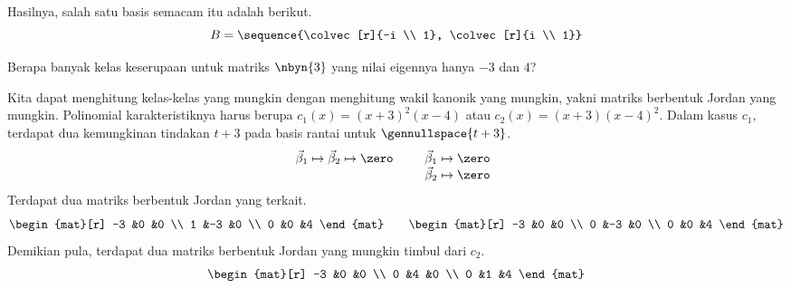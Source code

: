 \begin{exercises}
\begin{answer}
       Hasilnya, salah satu basis semacam itu adalah berikut.
       \begin{equation*}
         B=\sequence{\colvec[r]{-i \\ 1},
                     \colvec[r]{i \\ 1}}
       \end{equation*}  
     \end{answer}
  \item 
    Berapa banyak kelas keserupaan untuk matriks \( \nbyn{3} \)
    yang nilai eigennya hanya \( -3 \) dan \( 4 \)?
    \begin{answer}
     Kita dapat menghitung kelas-kelas yang mungkin dengan menghitung
     wakil kanonik yang mungkin, yakni matriks berbentuk Jordan yang mungkin.
     Polinomial karakteristiknya harus berupa $c_1(x)=(x+3)^2(x-4)$
     atau $c_2(x)=(x+3)(x-4)^2$.
     Dalam kasus $c_1$, terdapat dua kemungkinan tindakan
     $t+3$ pada basis rantai untuk $\gennullspace{t+3}$.
     \begin{equation*}
       \vec{\beta}_1\mapsto\vec{\beta}_2\mapsto \zero
       \qquad
       \begin{array}[t]{l}
         \vec{\beta}_1\mapsto\zero \\
         \vec{\beta}_2\mapsto\zero 
       \end{array}
     \end{equation*}
     Terdapat dua matriks berbentuk Jordan yang terkait.
     \begin{equation*}
        \begin{mat}[r]
          -3  &0  &0  \\
           1  &-3 &0  \\
           0  &0  &4
        \end{mat}
        \qquad
        \begin{mat}[r]
          -3  &0  &0  \\
           0  &-3 &0  \\
           0  &0  &4
        \end{mat}
      \end{equation*}
      Demikian pula, terdapat dua matriks berbentuk Jordan yang mungkin
      timbul dari $c_2$.
      \begin{equation*}
        \begin{mat}[r]
          -3  &0  &0  \\
           0  &4  &0  \\
           0  &1  &4
        \end{mat}

\end{equation*}
\end{answer}
\end{exercises}
